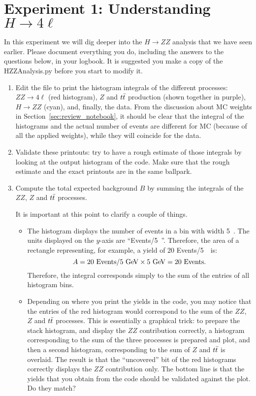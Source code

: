 
\section{Experiment 1: Understanding $H\rightarrow 4\ell$}

In this experiment we will dig deeper into the $H\rightarrow ZZ$ analysis that we have seen earlier. Please document everything you do, including the answers to the questions below, in your logbook. It is suggested you make a copy of the HZZAnalysis.py before you start to modify it.

\begin{enumerate} 
\item Edit the file to print the histogram integrals of the different processes: $ZZ\rightarrow 4\ell$ (red histogram), $Z$ and $t\bar{t}$ production (shown together in purple), $H\rightarrow ZZ$ (cyan), and, finally, the data. From the discussion about MC weights in Section~\ref{sec:review_notebook}, it should be clear that the integral of the histograms and the actual number of events are different for MC (because of all the applied weights), while they will coincide for the data. 
\item Validate these printouts: try to have a rough estimate of those integrals by looking at the output histogram of the code. Make sure that the rough estimate and the exact printouts are in the same ballpark.
\item Compute the total expected background $B$ by summing the integrals of the $ZZ$, $Z$ and $t\bar{t}$ processes. 
\begin{remark} 
It is important at this point to clarify a couple of things.
\begin{itemize}
\item The histogram displays the number of events in a bin with width 5\ \GeV. The units displayed on the $y$-axis are ``Events/5\ \GeV''. Therefore, the area of a rectangle representing, for example, a yield of 20 Events/5\ \GeV\ is: 
\begin{equation} 
A = 20\ \mathrm{Events/5\ \GeV} \times 5\ \GeV = 20\ \mathrm{Events}.
\end{equation} 
Therefore, the integral corresponds simply to the sum of the entries of all histogram bins. 
\item Depending on where you print the yields in the code, you may notice that the entries of the red histogram would correspond to the sum of the $ZZ$, $Z$ and $t\bar{t}$ processes. This is essentially a graphical trick: to prepare the stack histogram, and display the $ZZ$ contribution correctly, a histogram corresponding to the sum of the three processes is prepared and plot, and then a second histogram, corresponding to the sum of $Z$ and $t\bar{t}$ is overlaid. The result is that the ``uncovered'' bit of the red histograms correctly displays the $ZZ$ contribution only. The bottom line is that the yields that you obtain from the code should be validated against the plot. Do they match?    
\end{itemize}
\end{remark} 


\end{enumerate}
